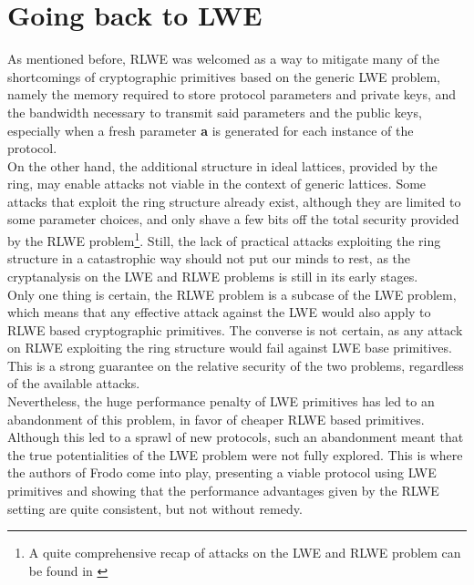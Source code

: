 
\section{Going back to LWE}
As mentioned before, RLWE was welcomed as a way to mitigate many of the shortcomings of cryptographic primitives based on the generic LWE problem, namely the memory required to store protocol parameters and private keys, and the bandwidth necessary to transmit said parameters and the public keys, especially when a fresh parameter \textbf{a} is generated for each instance of the protocol.\\
On the other hand, the additional structure in ideal lattices, provided by the ring, may enable attacks not viable in the context of generic lattices. Some attacks that exploit the ring structure already exist, although they are limited to some parameter choices, and only shave a few bits off the total security provided by the RLWE problem\footnote{A quite comprehensive recap of attacks on the LWE and RLWE problem can be found in \cite{RLWE_attacks}}. Still, the lack of practical attacks exploiting the ring structure in a catastrophic way should not put our minds to rest, as the cryptanalysis on the LWE and RLWE problems is still in its early stages.\\
Only one thing is certain, the RLWE problem is a subcase of the LWE problem, which means that any effective attack against the LWE would also apply to RLWE based cryptographic primitives. The converse is not certain, as any attack on RLWE exploiting the ring structure would fail against LWE base primitives. This is a strong guarantee on the relative security of the two problems, regardless of the available attacks.\\
Nevertheless, the huge performance penalty of LWE primitives has led to an abandonment of this problem, in favor of cheaper RLWE based primitives. Although this led to a sprawl of new protocols, such an abandonment meant that the true potentialities of the LWE problem were not fully explored. This is where the authors of Frodo \cite{frodo} come into play, presenting a viable protocol using LWE primitives and showing that the performance advantages given by the RLWE setting are quite consistent, but not without remedy. 

